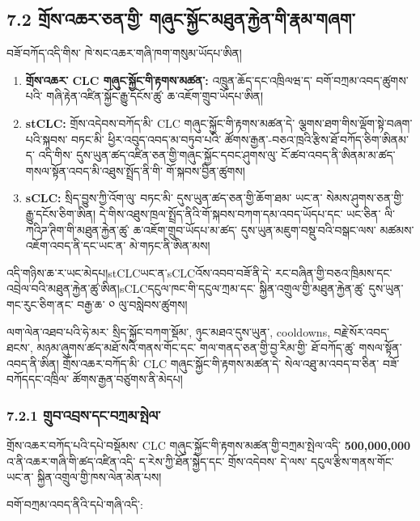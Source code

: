 \documentclass[11pt]{article}
\begin{document}
\subsection*{7.2 གྲོས་འཆར་ཅན་གྱི་ གཞུང་སྐྱོང་མཐུན་རྐྱེན་གི་རྣམ་གཞག་}

བཟོ་བཀོད་འདི་གིས་ ཁེ་སང་འཆར་གཞི་ཁག་གསུམ་ཡོདཔ་ཨིན།

\begin{enumerate}[leftmargin=*]
\item \textbf{གྲོས་འཆར་ CLC གཞུང་སྐྱོང་གི་རྟགས་མཚན་:} འཁྲུན་ཆོད་དང་འཁྲིལཝ་ད་ བགོ་བཀྲམ་འབད་ཚུགས་པའི་ གཞི་རྟེན་འཛིན་སྐྱོང་རྒྱུ་དངོས་ཚུ་ ཆ་འཇོག་གྲུབ་ཡོདཔ་ཨིན།
\item \textbf{stCLC:} གྲོས་འདེབས་བཀོད་མི་ CLC གཞུང་སྐྱོང་གི་རྟགས་མཚན་དེ་ ལྕགས་ཐག་གིས་ལྡོག་སྟེ་བཞག་པའི་སྐབས་ བཏང་མི་ ཕྱིར་འབུད་འབད་མ་བཏུབ་པའི་ ཚོགས་རྒྱན་-བཅའ་ཁྲའི་རྩིས་ཐོ་བཀོད་ཅིག་ཨིནམ་ད་ འདི་གིས་ དུས་ཡུན་ཚད་འཛིན་ཅན་གྱི་གཞུང་སྐྱོང་དབང་ཤུགས་ལུ་ ངོ་ཚབ་འབད་ནི་ཨིནམ་མ་ཚད་ གསལ་སྟོན་འབད་མི་འཐུས་སྤྲོད་ནི་གི་ གོ་སྐབས་བྱིན་ཚུགས།
\item \textbf{sCLC:} སྲིད་བྱུས་ཀྱི་འོག་ལུ་ བཏང་མི་ དུས་ཡུན་ཚད་ཅན་གྱི་ཆོག་ཐམ་ ཡང་ན་ སེམས་ཤུགས་ཅན་གྱི་ རྒྱུ་དངོས་ཅིག་ཨིན། དེ་གིས་འཐུས་ཁྲལ་སྤྲོད་ནིའི་གོ་སྐབས་བཀག་དམ་འབད་ཡོདཔ་དང་ ཡང་ཅིན་ ལི་ཀའིཌ་ཊིག་གི་མཐུན་རྐྱེན་ཚུ་ ཆ་འཇོག་གྲུབ་ཡོདཔ་མ་ཚད་ དུས་ཡུན་མཇུག་བསྡུ་བའི་བསྒང་ལས་ མཚམས་འཇོག་འབད་ནི་དང་ཡང་ན་ མེ་གཏང་ནི་ཨིན་མས།
\end{enumerate}
འདི་གཉིས་ཆ་ར་ཡང་མེདཔ།stCLCཡང་ན་sCLCའོས་འབབ་བཟོ་ནི་དེ་ རང་བཞིན་གྱི་བཅའ་ཁྲིམས་དང་འབྲེལ་བའི་མཐུན་རྐྱེན་ཚུ་ཨིན།sCLCདངུལ་ཁང་གི་དངུལ་ཀྲམ་དང་ སྐྱིན་འགྲུལ་གྱི་མཐུན་རྐྱེན་ཚུ་ དུས་ཡུན་གང་རུང་ཅིག་ནང་ བརྒྱ་ཆ་ ༠ ལུ་བསླེབས་ཚུགས།

ལག་ལེན་འཐབ་པའི་ཧེ་མར་ སྲིད་སྐྱོང་བཀག་སྡོམ་, ཉུང་མཐའ་དུས་ཡུན་, cooldowns, བརྗེ་སོར་འབད་ཐངས་, མཉམ་ཞུགས་ཚད་མཐོ་སའི་གནས་གོང་དང་ གལ་གནད་ཅན་གྱི་བྱ་རིམ་གྱི་ ཐོ་བཀོད་ཚུ་ གསལ་སྟོན་འབད་ནི་ཨིན། གྲོས་འཆར་བཀོད་མི་ CLC གཞུང་སྐྱོང་གི་རྟགས་མཚན་དེ་ སེལ་འཐུ་མ་འབད་བ་ཅིན་ བཟོ་བཀོདདང་འཁྲིལ་ ཚོགས་རྒྱན་བཙུགས་ནི་མེདཔ།

\subsubsection*{7.2.1 གྲུབ་འབྲས་དང་བཀྲམ་སྤེལ་}

གྲོས་འཆར་བཀོད་པའི་དཔེ་བསྡོམས་ CLC གཞུང་སྐྱོང་གི་རྟགས་མཚན་གྱི་བཀྲམ་སྤེལ་འདི་ \textbf{500,000,000} འ་ནི་འཆར་གཞི་གི་ཚད་འཛིན་འདི་ ད་རེས་ཀྱི་ཐོན་སྐྱེད་དང་ གྲོས་འདེབས་ དེ་ལས་ དངུལ་རྩིས་གནས་གོང་ ཡང་ན་ སྐྱིན་འགྲུལ་གྱི་ཁས་ལེན་མེན་པས།

བགོ་བཀྲམ་འབད་ནིའི་དཔེ་གཞི་འདི་:
\end{document}
